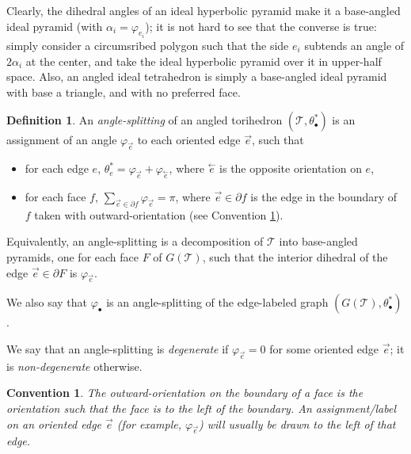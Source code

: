 \documentclass[11pt]{amsart}
\newcommand{\sT}{{\mathcal{T}}}
\newcommand{\cev}[1]{\overset{\leftarrow}{#1}}
\newcommand{\del}{\partial}
\newcommand{\vphi}{\varphi}
\theoremstyle{plain}
\newtheorem{convention}[theorem]{Convention}
\theoremstyle{definition}
\newtheorem{definition}[theorem]{Definition}
\begin{document}
Clearly, the dihedral angles of an ideal hyperbolic pyramid
make it a base-angled ideal pyramid
(with $\alpha_i = \vphi_{e_i}$);
it is not hard to see that the converse is true:
simply consider a circumsribed polygon such that the side $e_i$
subtends an angle of $2\alpha_i$ at the center,
and take the ideal hyperbolic pyramid over it in upper-half space.
Also, an angled ideal tetrahedron is simply a base-angled ideal pyramid
with base a triangle, and with no preferred face.

\begin{definition}
An \emph{angle-splitting} of an angled torihedron $(\sT,\theta_\bullet^*)$
is an assignment of an angle $\vphi_{\vec{e}}$ to each
oriented edge $\vec{e}$, such that

\begin{itemize}
\item for each edge $e$,
$\theta_e^* = \vphi_{\vec{e}} + \vphi_{\cev{e}}$,
where $\cev{e}$ is the opposite orientation on $e$,
\item for each face $f$,
$\sum_{\vec{e} \in \del f} \vphi_{\vec{e}} = \pi$,
where $\vec{e} \in \del f$ is the edge in the boundary of $f$
taken with outward-orientation
(see Convention \ref{cvn:ornt-edge}).
\end{itemize}


Equivalently, an angle-splitting is a decomposition of
$\sT$ into base-angled pyramids,
one for each face $F$ of $G(\sT)$, such that
the interior dihedral of the edge $\vec{e} \in \del F$
is $\vphi_{\vec{e}}$.


We also say that $\vphi_\bullet$ is an angle-splitting
of the edge-labeled graph $(G(\sT), \theta_\bullet^*)$.


We say that an angle-splitting is \emph{degenerate}
if $\vphi_{\vec{e}} = 0$ for some oriented edge $\vec{e}$;
it is \emph{non-degenerate} otherwise.
\end{definition}


\begin{convention}
The outward-orientation on the boundary of a face
is the orientation such that the face is to the left of the boundary.
An assignment/label on an oriented edge $\vec{e}$
(for example, $\vphi_{\vec{e}}$)
will usually be drawn to the left of that edge.
\label{cvn:ornt-edge}
\end{convention}
\end{document}
